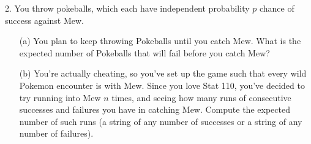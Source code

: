 \documentclass{article}
\begin{document}
2. You throw pokeballs, which each have independent probability $p$ chance of success against Mew.

\begin{enumerate}
    \item[(a)] You plan to keep throwing Pokeballs until you catch Mew. What is the expected number of Pokeballs that will fail before you catch Mew?
    
    
    \item[(b)] You're actually cheating, so you've set up the game such that every wild Pokemon encounter is with Mew. Since you love Stat 110, you've decided to try running into Mew $n$ times, and seeing how many runs of consecutive successes and failures you have in catching Mew. Compute the expected number of such runs (a string of any number of successes or a string of any number of failures).
    

\end{enumerate}
\end{document}
